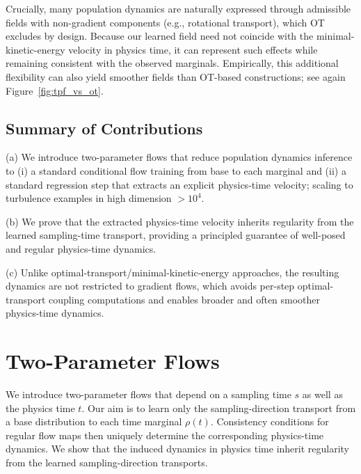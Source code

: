 \documentclass{article}
\theoremstyle{definition}
\theoremstyle{plain}
\theoremstyle{definition}
\theoremstyle{remark}
\begin{document}
Crucially, many population dynamics are naturally expressed through admissible fields with non-gradient components (e.g., rotational transport), which OT excludes by design. Because our learned field need not coincide with the minimal-kinetic-energy velocity in physics time, it can represent such effects while remaining consistent with the observed marginals. Empirically, this additional flexibility can also yield smoother fields than OT-based constructions; see again Figure~\ref{fig:tpf_vs_ot}.













    


\vspace*{-0.15cm}\subsection{Summary of Contributions}
(a) We introduce two-parameter flows that reduce population dynamics inference to (i) a standard conditional flow training from base to each marginal and (ii) a standard regression step that extracts an explicit physics-time velocity; scaling to turbulence examples in high dimension $> 10^4$.

(b) We prove that the extracted physics-time velocity inherits regularity from the learned sampling-time transport, providing a principled guarantee of well-posed and regular physics-time dynamics.

(c) Unlike optimal-transport/minimal-kinetic-energy approaches, the resulting dynamics are not restricted to gradient flows, which avoids per-step optimal-transport coupling computations and enables broader and often smoother physics-time dynamics. 











\section{Two-Parameter Flows}
We introduce two-parameter flows that depend on a sampling time $s$ as well as the physics time $t$. Our aim is to learn only the sampling-direction transport from a base distribution to each time marginal $\rho(t)$. Consistency conditions for regular flow maps then uniquely determine the corresponding physics-time dynamics. We show that the induced dynamics in physics time inherit regularity from the learned sampling-direction transports.  
\end{document}
